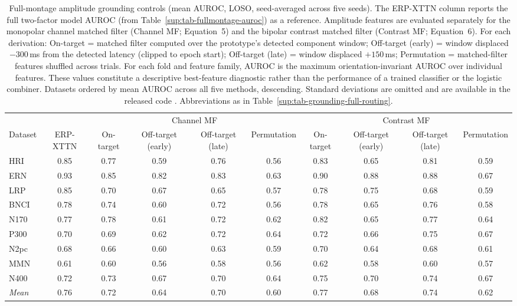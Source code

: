 \begin{table}[t]
\centering
\setlength{\tabcolsep}{5pt}
\caption{%
Full-montage amplitude grounding controls (mean AUROC, LOSO, seed-averaged across five seeds). The ERP-XTTN column reports the full two-factor model AUROC (from Table~\ref{sup:tab-fullmontage-auroc}) as a reference. Amplitude features are evaluated separately for the monopolar channel matched filter (Channel MF; Equation~5) and the bipolar contrast matched filter (Contrast MF; Equation~6). For each derivation: On-target = matched filter computed over the prototype's detected component window; Off-target (early) = window displaced $-300$\,ms from the detected latency (clipped to epoch start); Off-target (late) = window displaced $+150$\,ms; Permutation = matched-filter features shuffled across trials. For each fold and feature family, AUROC is the maximum orientation-invariant AUROC over individual features. These values constitute a descriptive best-feature diagnostic rather than the performance of a trained classifier or the logistic combiner. Datasets ordered by mean AUROC across all five methods, descending. Standard deviations are omitted and are available in the released code \cite{wyman2026erpxttn_code}. Abbreviations as in Table~\ref{sup:tab-grounding-full-routing}.%
}
\label{sup:tab-grounding-full-amp}
\begin{tabular}{l c cccc cccc}
\toprule
 & & \multicolumn{4}{c}{Channel MF} & \multicolumn{4}{c}{Contrast MF} \\
\cmidrule(lr){3-6} \cmidrule(lr){7-10}
Dataset & ERP-XTTN & On-target & Off-target (early) & Off-target (late) & Permutation & On-target & Off-target (early) & Off-target (late) & Permutation \\
\midrule
HRI & 0.85 & 0.77 & 0.59 & 0.76 & 0.56 & 0.83 & 0.65 & 0.81 & 0.59 \\
ERN & 0.93 & 0.85 & 0.82 & 0.83 & 0.63 & 0.90 & 0.88 & 0.88 & 0.67 \\
LRP & 0.85 & 0.70 & 0.67 & 0.65 & 0.57 & 0.78 & 0.75 & 0.68 & 0.59 \\
BNCI & 0.78 & 0.74 & 0.60 & 0.72 & 0.56 & 0.78 & 0.65 & 0.76 & 0.58 \\
N170 & 0.77 & 0.78 & 0.61 & 0.72 & 0.62 & 0.82 & 0.65 & 0.77 & 0.64 \\
P300 & 0.70 & 0.69 & 0.62 & 0.72 & 0.64 & 0.72 & 0.66 & 0.75 & 0.67 \\
N2pc & 0.68 & 0.66 & 0.60 & 0.63 & 0.59 & 0.70 & 0.64 & 0.68 & 0.61 \\
MMN & 0.61 & 0.60 & 0.56 & 0.58 & 0.56 & 0.62 & 0.58 & 0.60 & 0.57 \\
N400 & 0.72 & 0.73 & 0.67 & 0.70 & 0.64 & 0.75 & 0.70 & 0.74 & 0.67 \\
\midrule
\textit{Mean} & 0.76 & 0.72 & 0.64 & 0.70 & 0.60 & 0.77 & 0.68 & 0.74 & 0.62 \\
\bottomrule
\end{tabular}
\end{table}
